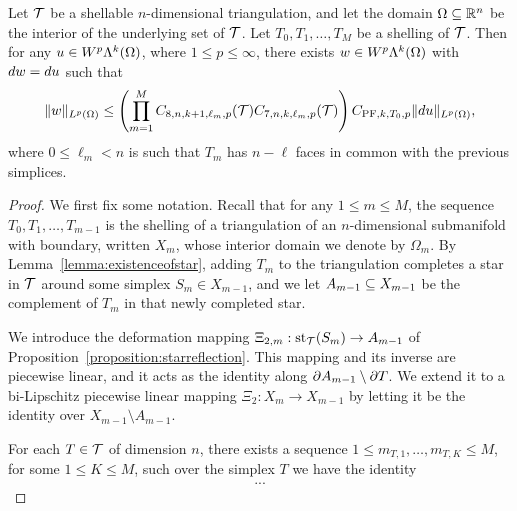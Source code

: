 \documentclass[10pt,a4paper]{article}
\begin{document}
\begin{theorem}\label{theorem:poincarefriedrichsestimate:exterior:contraction}
    Let ${\mathcal T}$ be a shellable $n$-dimensional triangulation, and let the domain $\Omega \subseteq {\mathbb R}^{n}$ be the interior of the underlying set of ${\mathcal T}$.
    Let $T_0, T_1, \dots, T_M$ be a shelling of ${\mathcal T}$.
    Then for any $u \in W^{p}\Lambda^{k}(\Omega)$, where $1 \leq p \leq \infty$, 
    there exists $w \in W^{p}\Lambda^{k}(\Omega)$ with $d w = d u$ 
    such that 
    \begin{align*}
        \| w \|_{L^{p}(\Omega)}
        \leq 
        \left( 
        \prod_{m=1}^{M}
            C_{8,n,k+1,\ell_{m},p}({\mathcal T})
            C_{7,n,k  ,\ell_{m},p}({\mathcal T})
        \right)
        C_{{{\rm PF}},k,T_{0},p}
        \| d u \|_{L^{p}(\Omega)}
        ,
    \end{align*}
    where $0 \leq \ell_{m} < n$ is such that $T_{m}$ has $n - \ell$ faces in common with the previous simplices.
\end{theorem}
\begin{proof}\color{blue}
    We first fix some notation. 
    Recall that for any $1 \leq m \leq M$, 
    the sequence $T_0, T_1, \dots, T_{m-1}$ is the shelling of a triangulation of an $n$-dimensional submanifold with boundary, 
    written $X_{m}$, whose interior domain we denote by $\Omega_m$. 
    By Lemma~\ref{lemma:existenceofstar}, adding $T_{m}$ to the triangulation completes a star in ${\mathcal T}$ around some simplex $S_{m} \in X_{m-1}$, 
    and we let $A_{m-1} \subseteq X_{m-1}$ be the complement of $T_{m}$ in that newly completed star. 
    
    We introduce the deformation mapping $\Xi_{2,m} : \operatorname{st}_{{\mathcal T}}(S_m) \rightarrow A_{m-1}$ of Proposition~\ref{proposition:starreflection}. 
    This mapping and its inverse are piecewise linear, and it acts as the identity along $\partial A_{m-1} \setminus \partial T$.
    We extend it to a bi-Lipschitz piecewise linear mapping $\Xi_{2} : X_{m} \rightarrow X_{m-1}$ 
    by letting it be the identity over $X_{m-1} \setminus A_{m-1}$.
    
    For each $T \in {\mathcal T}$ of dimension $n$, there exists a sequence $1 \leq m_{T,1},\dots,m_{T,K} \leq M$, for some $1 \leq K \leq M$,
    such over the simplex $T$ we have the identity 
    \begin{align*}
        ...
    \end{align*}
\end{proof}
\end{document}
